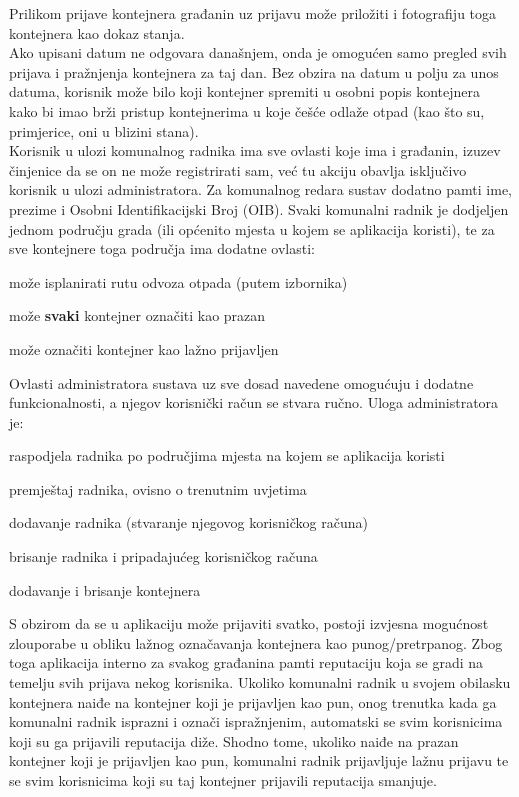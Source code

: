 Prilikom prijave kontejnera građanin uz prijavu može priložiti i fotografiju toga kontejnera kao dokaz stanja.\\

Ako upisani datum ne odgovara današnjem, onda je omogućen samo pregled svih prijava i pražnjenja kontejnera za taj dan. Bez obzira na datum u polju za unos datuma, korisnik može bilo koji kontejner spremiti u osobni popis kontejnera kako bi imao brži pristup kontejnerima u koje češće odlaže otpad (kao što su, primjerice, oni u blizini stana).\\

Korisnik u ulozi komunalnog radnika ima sve ovlasti koje ima i građanin, izuzev činjenice da se on ne može registrirati sam, već tu akciju obavlja isključivo korisnik u ulozi administratora. Za komunalnog redara sustav dodatno pamti ime, prezime i Osobni Identifikacijski Broj (OIB). Svaki komunalni radnik je dodjeljen jednom području grada (ili općenito mjesta u kojem se aplikacija koristi), te za sve kontejnere toga područja ima dodatne ovlasti:
\begin{packed_item}
	\item može isplanirati rutu odvoza otpada (putem izbornika)
	\item može \textbf{svaki} kontejner označiti kao prazan
	\item može označiti kontejner kao lažno prijavljen
\end{packed_item}

Ovlasti administratora sustava uz sve dosad navedene omogućuju i dodatne funkcionalnosti, a njegov korisnički račun se stvara ručno. Uloga administratora je:
\begin{packed_item}
	\item raspodjela radnika po područjima mjesta na kojem se aplikacija koristi
	\item premještaj radnika, ovisno o trenutnim uvjetima
	\item dodavanje radnika (stvaranje njegovog korisničkog računa)
	\item brisanje radnika i pripadajućeg korisničkog računa
	\item dodavanje i brisanje kontejnera
\end{packed_item}

S obzirom da se u aplikaciju može prijaviti svatko, postoji izvjesna mogućnost zlouporabe u obliku lažnog označavanja kontejnera kao punog/pretrpanog. Zbog toga aplikacija interno za svakog građanina pamti reputaciju koja se gradi na temelju svih prijava nekog korisnika. Ukoliko komunalni radnik u svojem obilasku kontejnera naiđe na kontejner koji je prijavljen kao pun, onog trenutka kada ga komunalni radnik isprazni i označi ispražnjenim, automatski se svim korisnicima koji su ga prijavili reputacija diže. Shodno tome, ukoliko naiđe na prazan kontejner koji je prijavljen kao pun, komunalni radnik prijavljuje lažnu prijavu te se svim korisnicima koji su taj kontejner prijavili reputacija smanjuje.\\

